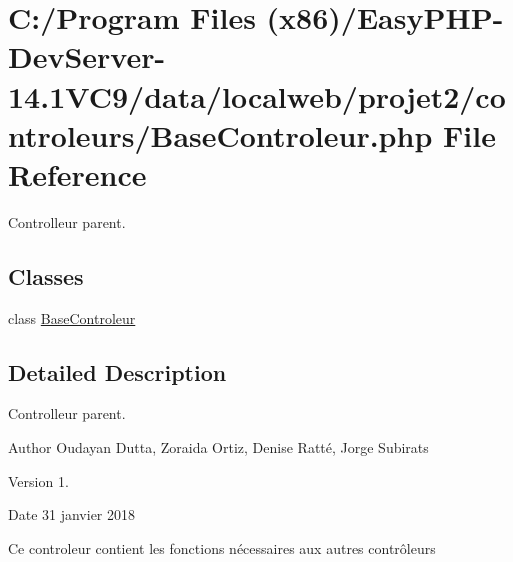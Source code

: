 \hypertarget{_base_controleur_8php}{}\section{C\+:/\+Program Files (x86)/\+Easy\+P\+H\+P-\/\+Dev\+Server-\/14.1\+V\+C9/data/localweb/projet2/controleurs/\+Base\+Controleur.php File Reference}
\label{_base_controleur_8php}


Controlleur parent.  


\subsection*{Classes}
\begin{DoxyCompactItemize}
\item 
class \hyperlink{class_base_controleur}{Base\+Controleur}
\end{DoxyCompactItemize}


\subsection{Detailed Description}
Controlleur parent. 

\begin{DoxyAuthor}{Author}
Oudayan Dutta, Zoraida Ortiz, Denise Ratté, Jorge Subirats 
\end{DoxyAuthor}
\begin{DoxyVersion}{Version}
1. 
\end{DoxyVersion}
\begin{DoxyDate}{Date}
31 janvier 2018
\end{DoxyDate}
Ce controleur contient les fonctions nécessaires aux autres contrôleurs 